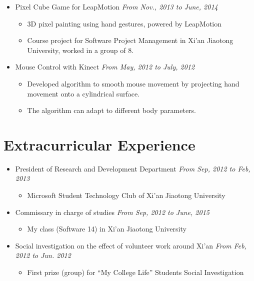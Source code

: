\documentclass[letterpaper,11pt]{article}
\newenvironment{extra}{}{}
\newenvironment{excurr}{}{}
\begin{document}
\begin{itemize}
    \item Pixel Cube Game for LeapMotion \hfill \textit{From Nov., 2013 to June, 2014}
    \begin{itemize}
        \item 3D pixel painting using hand gestures, powered by LeapMotion
        \item Course project for Software Project Management in Xi'an Jiaotong University, worked in a group
of 8.
    \end{itemize}

\begin{extra}
    \item Mouse Control with Kinect \hfill \textit{From May, 2012 to July, 2012}
    \begin{itemize}
        \item Developed algorithm to smooth mouse movement by projecting hand movement onto a 
cylindrical surface.
        \item The algorithm can adapt to different body parameters.
    \end{itemize}
\end{extra}

\end{itemize}


\begin{excurr}
\section{Extracurricular Experience}

\begin{itemize}
    \item President of Research and Development Department \hfill \textit{From Sep, 2012 to Feb, 2013}
    \begin{itemize}
        \item Microsoft Student Technology Club of Xi’an Jiaotong University
    \end{itemize}

    \item Commissary in charge of studies \hfill \textit{From Sep, 2012 to June, 2015}
    \begin{itemize}
        \item My class (Software 14) in Xi’an Jiaotong University
    \end{itemize}

    \item Social investigation on the effect of volunteer work around Xi’an \hfill \textit{From Feb, 2012 to
Jun. 2012}
    \begin{itemize}
        \item First prize (group) for ``My College Life'' Students Social Investigation
    \end{itemize}

\end{itemize}
\end{excurr}
\end{document}
